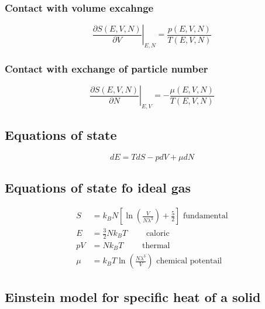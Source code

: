 \subsubsection*{Contact with volume excahnge}

\begin{equation*}
    \left. \frac{\partial S(E,V,N)}{\partial V} \right|_{E,N} = \frac{p(E,V,N)}{T(E,V,N)}
\end{equation*}

\subsubsection*{Contact with exchange of particle number}

\begin{equation*}
    \left. \frac{\partial S(E,V,N)}{\partial N} \right|_{E,V} = - \frac{\mu (E,V,N)}{T(E,V,N)}
\end{equation*}

\subsection*{Equations of state}

\begin{equation*}
    dE = TdS - pdV + \mu dN
\end{equation*}

\subsection*{Equations of state fo ideal gas}

\begin{equation*}
    \begin{aligned}
        S &= k_B N \left[\ln \left( \frac{V}{N \lambda^3}\right) + \frac{5}{2}\right] \text{ fundamental} \\
        E &= \frac{3}{2} N k_B T \qquad \text{ caloric} \\
        pV &= N k_B T \qquad \text{ thermal}\\
        \mu &= k_B T \ln \left(\frac{N\lambda^3}{V}\right) \text{ chemical potentail}
    \end{aligned}
\end{equation*}

\subsection*{Einstein model for specific heat of a solid}


